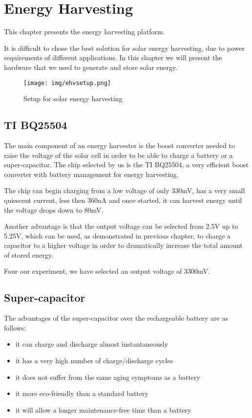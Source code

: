 \normalfont\normalsize
\chapter{Energy Harvesting}

This chapter presents the energy harvesting platform.

It is difficult to chose the best solution for solar energy harvesting, due to power requirements
of different applications. In this chapter we will present the hardware that we used to generate
and store solar energy.

\begin{figure}[ht] \centering
\texttt{[image: img/ehvsetup.png]}
\caption{Setup for solar energy harvesting}
\end{figure}

\section{TI BQ25504}
The main component of an energy harvester is the boost converter needed to raise the voltage of the
solar cell in order to be able to charge a battery or a super-capacitor. The chip selected by us is
the TI BQ25504, a very efficient boost converter with battery management for energy harvesting.

The chip can begin charging from a low voltage of only 330mV, has a very small quiescent current,
less then 360nA and once started, it can harvest energy until the voltage drops down to 80mV.

Another advantage is that the output voltage can be selected from 2.5V up to 5.25V, which can be
used, as demonstrated in previous chapter, to charge a capacitor to a higher voltage in order
to dramatically increase the total amount of stored energy.

Four our experiment, we have selected an output voltage of 3300mV.

\section{Super-capacitor}
The advantages of the super-capacitor over the rechargeable battery are as follows:

\begin{itemize}
\item it can charge and discharge almost instantaneously
\item it has a very high number of charge/discharge cycles
\item it does not suffer from the same aging symptoms as a battery
\item it more eco-friendly than a standard battery
\item it will allow a longer maintenance-free time than a battery

\end{itemize}

